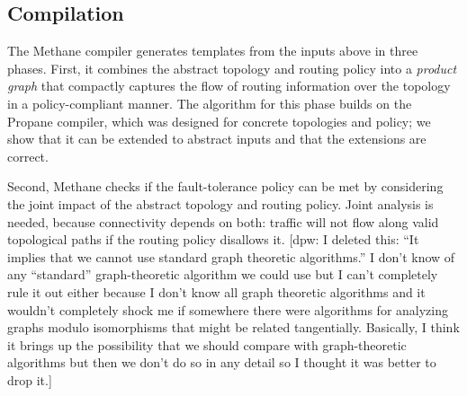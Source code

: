 \documentclass[numbers, 10pt, preprint]{sigplanconf}
\newcommand{\dpw}[1]{\textcolor{tmlblue}{[dpw: #1]}}
\newcommand{\sysname}{{\small \sf Methane}\xspace}
\begin{document}
\subsection{Compilation}


The \sysname compiler generates templates from the inputs above in three phases. First, it combines the abstract topology and routing policy into a {\em product graph} that compactly captures the flow of routing information over the topology in a policy-compliant manner. The algorithm for this phase builds on the Propane compiler, which was designed for concrete topologies and policy; we show that it can be extended to abstract inputs and that the extensions are correct.

Second, \sysname checks if the fault-tolerance policy can be met by considering the joint impact of the abstract topology and routing policy. Joint analysis is needed, because connectivity depends on both: traffic will not flow along
valid topological paths if the routing policy disallows it. 
\dpw{I deleted this:  ``It implies that we cannot use standard graph theoretic algorithms.''  I don't know of any ``standard'' graph-theoretic algorithm
we could use but I can't completely rule it out either because I don't
know all graph theoretic algorithms and it wouldn't completely shock 
me if somewhere there were algorithms for analyzing graphs modulo
isomorphisms that might be related tangentially.  Basically, I think
it brings up the possibility that we should compare with graph-theoretic
algorithms but then we don't do so in any detail
so I thought it was better to drop it.}
\end{document}

